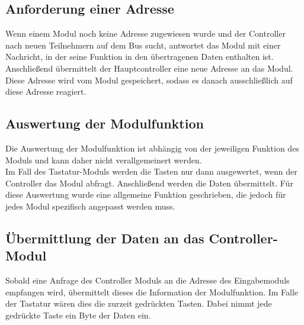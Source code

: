 \subsection{Anforderung einer Adresse}
Wenn einem Modul noch keine Adresse zugewiesen wurde und der Controller nach neuen Teilnehmern auf dem Bus sucht, antwortet das Modul mit einer Nachricht, in der seine Funktion in den übertragenen Daten enthalten ist. Anschließend übermittelt der Hauptcontroller eine neue Adresse an das Modul. Diese Adresse wird vom Modul gespeichert, sodass es danach ausschließlich auf diese Adresse reagiert.\\




\subsection{Auswertung der Modulfunktion}
Die Auswertung der Modulfunktion ist abhängig von der jeweiligen Funktion des Moduls und kann daher nicht verallgemeinert werden.\\
Im Fall des Tastatur-Moduls werden die Tasten nur dann ausgewertet, wenn der Controller das Modul abfragt. Anschließend werden die Daten übermittelt. Für diese Auswertung wurde eine allgemeine Funktion geschrieben, die jedoch für jedes Modul spezifisch angepasst werden muss.\\



\subsection{Übermittlung der Daten an das Controller-Modul}
Sobald eine Anfrage des Controller Moduls an die Adresse des Eingabemoduls empfangen wird, übermittelt dieses die Information der Modulfunktion. Im Falle der Tastatur wären dies die zurzeit gedrückten Tasten. Dabei nimmt jede gedrückte Taste ein Byte der Daten ein.


